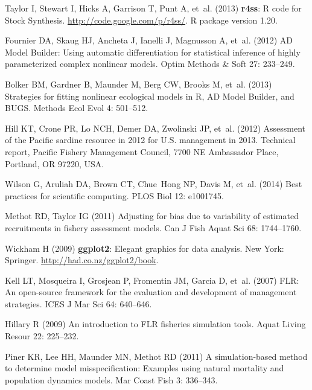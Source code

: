 \documentclass[11pt]{article}
\begin{document}
\begin{spacing}{1.2}
\begin{thebibliography}{10}
Taylor I, Stewart I, Hicks A, Garrison T, Punt A, et~al. (2013) \textbf{r4ss}:
  \textsf{R} code for Stock Synthesis.
\newblock \urlprefix\url{http://code.google.com/p/r4ss/}.
\newblock \textsf{R} package version 1.20.

Fournier DA, Skaug HJ, Ancheta J, Ianelli J, Magnusson A, et~al. (2012) {AD
  Model Builder}: Using automatic differentiation for statistical inference of
  highly parameterized complex nonlinear models.
\newblock Optim Methods \& Soft 27: 233--249.

Bolker BM, Gardner B, Maunder M, Berg CW, Brooks M, et~al. (2013) Strategies
  for fitting nonlinear ecological models in {R}, {AD Model Builder}, and
  {BUGS}.
\newblock Methods Ecol Evol 4: 501--512.

Hill KT, Crone PR, Lo NCH, Demer DA, Zwolinski JP, et~al. (2012) Assessment of
  the {Pacific} sardine resource in 2012 for {U.S.} management in 2013.
\newblock Technical report, Pacific Fishery Management Council, 7700 NE
  Ambassador Place, Portland, OR 97220, USA.

Wilson G, Aruliah DA, Brown CT, Chue~Hong NP, Davis M, et~al. (2014) Best
  practices for scientific computing.
\newblock PLOS Biol 12: e1001745.

Methot RD, Taylor IG (2011) Adjusting for bias due to variability of estimated
  recruitments in fishery assessment models.
\newblock Can J Fish Aquat Sci 68: 1744--1760.

Wickham H (2009) \textbf{ggplot2}: Elegant graphics for data analysis.
\newblock New York: Springer.
\newblock \urlprefix\url{http://had.co.nz/ggplot2/book}.

Kell LT, Mosqueira I, Grosjean P, Fromentin JM, Garcia D, et~al. (2007) {FLR}:
  An open-source framework for the evaluation and development of management
  strategies.
\newblock ICES J Mar Sci 64: 640--646.

Hillary R (2009) An introduction to {FLR} fisheries simulation tools.
\newblock Aquat Living Resour 22: 225--232.

Piner KR, Lee HH, Maunder MN, Methot RD (2011) A simulation-based method to
  determine model misspecification: Examples using natural mortality and
  population dynamics models.
\newblock Mar Coast Fish 3: 336--343.


\end{thebibliography}
\end{spacing}
\end{document}
